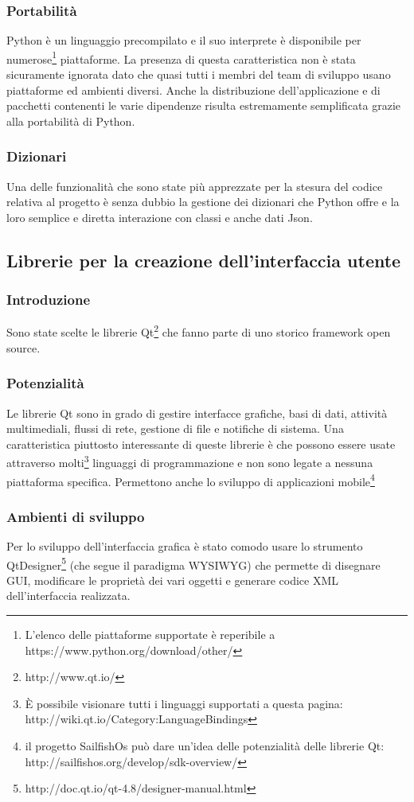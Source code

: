 \documentclass[12pt]{scrartcl}
\begin{document}
\subsubsection{Portabilit\`a}
Python \`e un linguaggio precompilato e il suo interprete \`e disponibile per
numerose\footnote{L'elenco delle piattaforme supportate \`e reperibile a https://www.python.org/download/other/} piattaforme. 
La presenza di questa caratteristica non \`e stata sicuramente
ignorata dato che quasi tutti i membri del team di sviluppo usano piattaforme ed ambienti
diversi. Anche la distribuzione dell'applicazione e di pacchetti contenenti le 
varie dipendenze risulta estremamente semplificata grazie alla portabilit\`a di Python.


\subsubsection{Dizionari}
Una delle funzionalit\`a che sono state pi\`u apprezzate per la stesura del codice
relativa al progetto \`e senza dubbio la gestione dei dizionari che Python offre
e la loro semplice e diretta interazione con classi e anche dati Json.


\subsection{Librerie per la creazione dell'interfaccia utente}
\subsubsection{Introduzione}
Sono state scelte le librerie Qt\footnote{http://www.qt.io/} che fanno parte di uno storico
framework open source. 
\subsubsection{Potenzialit\`a}
Le librerie Qt sono in grado di gestire interfacce grafiche, basi di dati, 
attivit\`a multimediali, flussi di rete, gestione di file e notifiche di sistema.
Una caratteristica piuttosto interessante di queste librerie \`e che possono essere usate
attraverso molti\footnote{\`E possibile visionare tutti i linguaggi supportati a questa pagina: 
http://wiki.qt.io/Category:LanguageBindings}
linguaggi di programmazione e non sono legate a nessuna piattaforma specifica.
Permettono anche lo sviluppo di applicazioni mobile\footnote{
il progetto SailfishOs pu\`o dare un'idea delle potenzialit\`a delle librerie Qt:
http://sailfishos.org/develop/sdk-overview/}
\subsubsection{Ambienti di sviluppo}
Per lo sviluppo dell'interfaccia grafica \`e stato comodo usare lo strumento
QtDesigner\footnote{http://doc.qt.io/qt-4.8/designer-manual.html} (che segue il paradigma WYSIWYG) 
che permette di disegnare GUI, modificare le propriet\`a dei vari
oggetti e generare codice XML dell'interfaccia realizzata.
\end{document}
